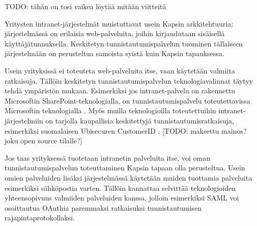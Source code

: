 TODO: tähän on tosi vaikea löytää mitään viitteitä

Yritysten intranet-järjestelmät muistuttavat usein Kapsin arkkitehtuuria: järjestelmässä on erilaisia web-palveluita, joihin kirjaudutaan sisäisellä käyttäjätunnuksella. Keskitetyn tunnistautumispalvelun tuominen tällaiseen järjestelmään on perusteltua samoista syistä kuin Kapsin tapauksessa.

Usein yrityksissä ei toteuteta web-palveluita itse, vaan käytetään valmiita ratkaisuja. Tällöin keskitetyn tunnistautumispalvelun teknologiavalinnat täytyy tehdä ympäristön mukaan. Esimerkiksi jos intranet-palvelu on rakennettu Microsoftin SharePoint-teknologialla, on tunnistautumispalvelu toteutettavissa Microsoftin teknologialla \cite{sharepoint}. Myös muilla teknologioilla toteutettuihin intranet-järjestelmiin on tarjolla kaupallisia keskitettyjä tunnistautumisratkaisuja, esimerkiksi suomalaisen Ubisecuren CustomerID \cite{ubisecure}. [TODO: maksettu mainos? joku open source tilalle?]

Jos taas yrityksessä tuotetaan intranetin palveluita itse, voi oman tunnistautumispalvelun toteuttaminen Kapsin tapaan olla perusteltua. Usein omien palveluiden lisäksi järjestelmässä käytetään muiden tuottamia palveluita esimerkiksi sähköpostia varten. Tällöin kannattaa selvittää teknologioiden yhteensopivuus valmiiden palveluiden kanssa, jolloin esimerkiksi SAML voi osoittautua OAuthia paremmaksi ratkaisuksi tunnistautumisen rajapintaprotokollaksi.